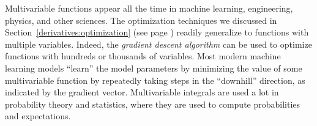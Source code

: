 		Multivariable functions appear all the time in machine learning, engineering, physics, and other sciences.
		The optimization techniques we discussed in
		Section~\ref{derivatives:optimization} (see page \pageref{derivatives:optimization})
		readily generalize to functions with multiple variables.
		Indeed,
		the \emph{gradient descent algorithm} can be used to optimize functions
		with hundreds or thousands of variables.
		Most modern machine learning models
		``learn'' the model parameters by minimizing the value of some multivariable function
		by repeatedly taking steps in the ``downhill'' direction,
		as indicated by the gradient vector.
		Multivariable integrals are used a lot in probability theory and statistics,
		where they are used to compute probabilities and expectations.			






